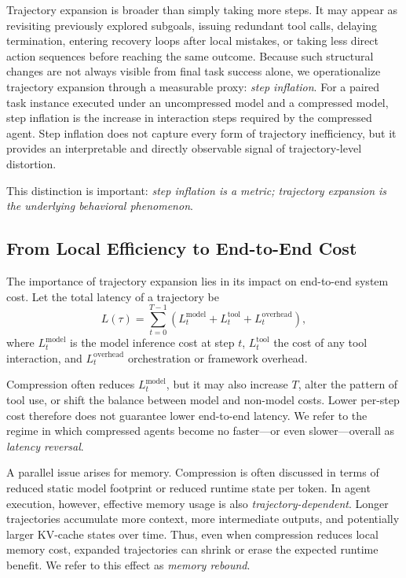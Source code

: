 \documentclass{article}
\begin{document}
Trajectory expansion is broader than simply taking more steps. It may appear as revisiting previously explored subgoals, issuing redundant tool calls, delaying termination, entering recovery loops after local mistakes, or taking less direct action sequences before reaching the same outcome. Because such structural changes are not always visible from final task success alone, we operationalize trajectory expansion through a measurable proxy: \emph{step inflation}. For a paired task instance executed under an uncompressed model and a compressed model, step inflation is the increase in interaction steps required by the compressed agent. Step inflation does not capture every form of trajectory inefficiency, but it provides an interpretable and directly observable signal of trajectory-level distortion.

This distinction is important: \emph{step inflation is a metric; trajectory expansion is the underlying behavioral phenomenon}.

\subsection{From Local Efficiency to End-to-End Cost}

The importance of trajectory expansion lies in its impact on end-to-end system cost. Let the total latency of a trajectory be
\[
L(\tau) = \sum_{t=0}^{T-1} \left( L_t^{\text{model}} + L_t^{\text{tool}} + L_t^{\text{overhead}} \right),
\]
where $L_t^{\text{model}}$ is the model inference cost at step $t$, $L_t^{\text{tool}}$ the cost of any tool interaction, and $L_t^{\text{overhead}}$ orchestration or framework overhead.

Compression often reduces $L_t^{\text{model}}$, but it may also increase $T$, alter the pattern of tool use, or shift the balance between model and non-model costs. Lower per-step cost therefore does not guarantee lower end-to-end latency. We refer to the regime in which compressed agents become no faster---or even slower---overall as \emph{latency reversal}.

A parallel issue arises for memory. Compression is often discussed in terms of reduced static model footprint or reduced runtime state per token. In agent execution, however, effective memory usage is also \emph{trajectory-dependent}. Longer trajectories accumulate more context, more intermediate outputs, and potentially larger KV-cache states over time. Thus, even when compression reduces local memory cost, expanded trajectories can shrink or erase the expected runtime benefit. We refer to this effect as \emph{memory rebound}.
\end{document}
